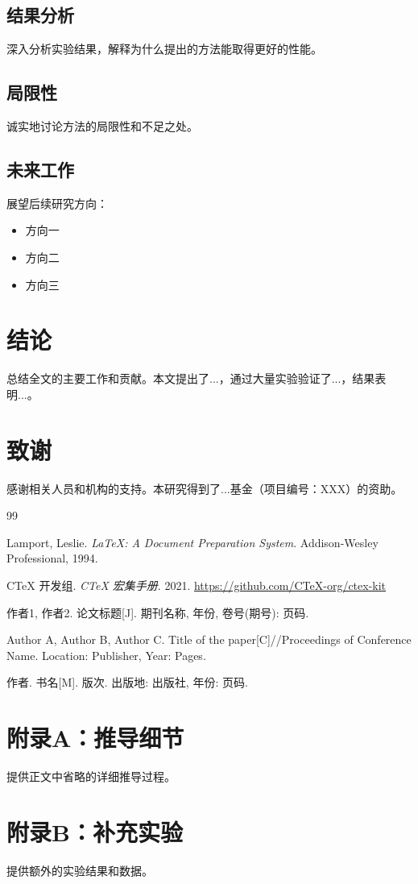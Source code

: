 \documentclass[12pt,a4paper]{article}
\begin{document}
\subsection{结果分析}

深入分析实验结果，解释为什么提出的方法能取得更好的性能。

\subsection{局限性}

诚实地讨论方法的局限性和不足之处。

\subsection{未来工作}

展望后续研究方向：
\begin{itemize}
    \item 方向一
    \item 方向二
    \item 方向三
\end{itemize}

\section{结论}

总结全文的主要工作和贡献。本文提出了...，通过大量实验验证了...，结果表明...。

\section*{致谢}

感谢相关人员和机构的支持。本研究得到了...基金（项目编号：XXX）的资助。

\begin{thebibliography}{99}

Lamport, Leslie. \textit{LaTeX: A Document Preparation System}. Addison-Wesley Professional, 1994.

CTeX 开发组. \textit{CTeX 宏集手册}. 2021. \url{https://github.com/CTeX-org/ctex-kit}

作者1, 作者2. 论文标题[J]. 期刊名称, 年份, 卷号(期号): 页码.

Author A, Author B, Author C. Title of the paper[C]//Proceedings of Conference Name. Location: Publisher, Year: Pages.

作者. 书名[M]. 版次. 出版地: 出版社, 年份: 页码.

\end{thebibliography}

\appendix

\section{附录A：推导细节}

提供正文中省略的详细推导过程。

\section{附录B：补充实验}

提供额外的实验结果和数据。
\end{document}
